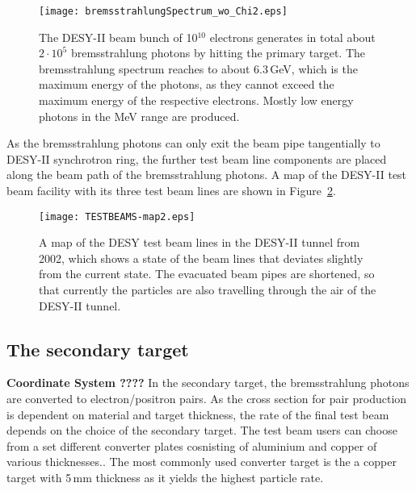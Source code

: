 \begin{figure}[htbp]
  \centering
    \texttt{[image: bremsstrahlungSpectrum\_wo\_Chi2.eps]}
  \caption[Simulated bremsstrahlung spectrum emitted from the primary target.]{The DESY-II beam bunch of 10$^{10}$ electrons generates in total about $2\cdot10^5$ bremsstrahlung photons by hitting the primary target. The bremsstrahlung spectrum reaches to about 6.3\,GeV, which is the maximum energy of the photons, as they cannot exceed the maximum energy of the respective electrons. Mostly low energy photons in the MeV range are produced.}
  \label{fig:bremsstrahlung_spectrum}
\end{figure}


 
As the bremsstrahlung photons can only exit the beam pipe tangentially to DESY-II 
synchrotron ring, the further test beam line components are placed along the 
beam path of the bremsstrahlung photons. A map of the DESY-II test beam facility with its three test beam lines are 
shown in Figure~\ref{fig:Test Beam Lines}.

\begin{figure}[ht]
  \centering
  \texttt{[image: TESTBEAMS-map2.eps]}
  \caption[A map of the DESY test beam lines in the DESY-II tunnel.]{A map of the DESY test beam lines in the DESY-II tunnel from 2002, which shows a state of the beam lines that deviates slightly from the current state.\cite{testbeam-web2-fig}  The evacuated beam pipes are shortened, so that currently the particles are also travelling through the air of the DESY-II tunnel.}
    \label{fig:Test Beam Lines}
\end{figure}

\subsection{The secondary target}
{\bfseries{Coordinate System ????}}
In the secondary target, the bremsstrahlung photons are converted to electron/positron pairs.  As the cross section for pair production is dependent on material and target thickness, the rate of the final test beam depends on the choice of the secondary target. The test beam users can choose from a set different converter plates cosnisting of aluminium and copper of various thicknesses.. The most commonly used converter target is the a copper target with 5\,mm thickness as it yields the highest particle rate.

